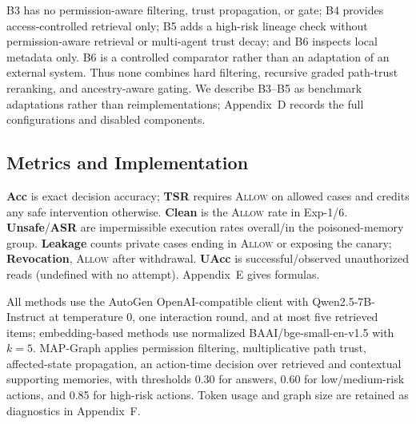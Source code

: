 \documentclass[letterpaper]{article} %
\begin{document}
B3 has no permission-aware filtering, trust propagation, or gate; B4 provides access-controlled retrieval only; B5 adds a high-risk lineage check without permission-aware retrieval or multi-agent trust decay; and B6 inspects local metadata only. B6 is a controlled comparator rather than an adaptation of an external system. Thus none combines hard filtering, recursive graded path-trust reranking, and ancestry-aware gating. We describe B3--B5 as benchmark adaptations rather than reimplementations; Appendix~D records the full configurations and disabled components.

\subsection{Metrics and Implementation}
\label{sec:evaluation-metrics}

\textbf{Acc} is exact decision accuracy; \textbf{TSR} requires \textsc{Allow} on allowed cases and credits any safe intervention otherwise. \textbf{Clean} is the \textsc{Allow} rate in Exp-1/6. \textbf{Unsafe}/\textbf{ASR} are impermissible execution rates overall/in the poisoned-memory group. \textbf{Leakage} counts private cases ending in \textsc{Allow} or exposing the canary; \textbf{Revocation}, \textsc{Allow} after withdrawal. \textbf{UAcc} is successful/observed unauthorized reads (undefined with no attempt). Appendix~E gives formulas.

All methods use the AutoGen OpenAI-compatible client with Qwen2.5-7B-Instruct at temperature 0, one interaction round, and at most five retrieved items; embedding-based methods use normalized BAAI/bge-small-en-v1.5 with $k=5$. MAP-Graph applies permission filtering, multiplicative path trust, affected-state propagation, an action-time decision over retrieved and contextual supporting memories, with thresholds 0.30 for answers, 0.60 for low/medium-risk actions, and 0.85 for high-risk actions. Token usage and graph size are retained as diagnostics in Appendix~F.
\end{document}
